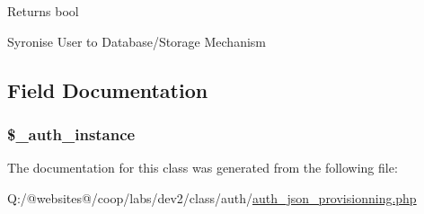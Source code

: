\begin{DoxyReturn}{Returns}
bool 
\end{DoxyReturn}
Syronise User to Database/\-Storage Mechanism

\subsection{Field Documentation}
\hypertarget{class_xortify_auth_json_provisionning_a486ed878bb5a7188c99ac4c9ee46ac6e}{
\subsubsection[{\$\-\_\-auth\-\_\-instance}]{\setlength{\rightskip}{0pt plus 5cm}\$\-\_\-auth\-\_\-instance}}\label{class_xortify_auth_json_provisionning_a486ed878bb5a7188c99ac4c9ee46ac6e}


The documentation for this class was generated from the following file\-:\begin{DoxyCompactItemize}
\item 
Q\-:/@websites@/coop/labs/dev2/class/auth/\hyperlink{auth__json__provisionning_8php}{auth\-\_\-json\-\_\-provisionning.\-php}\end{DoxyCompactItemize}
